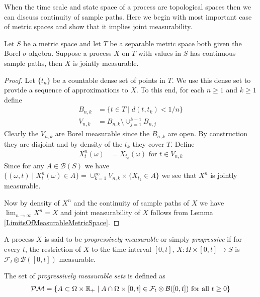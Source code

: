 When the time scale and state space of a process are topological
spaces then we can discuss continuity of sample paths.  Here we begin
with most important case of metric spaces and show that it implies
joint measurability.
\begin{lem}\label{JointMeasurabilityOfSampleContinuous}Let $S$ be a metric space and let $T$ be a separable metric
  space both given the Borel $\sigma$-algebra.  Suppose a process $X$
  on $T$ with values in $S$ has continuous sample paths, then $X$ is
  jointly measurable.
\end{lem}
\begin{proof}
Let $\lbrace t_n \rbrace$ be a countable dense set of points in $T$.
We use this dense set to provide a sequence of approximations to $X$.
To this end, for each $n\geq 1$ and $k \geq 1$ define
\begin{align*}
B_{n,k} &= \lbrace t \in T \mid d(t, t_k) < 1/n \rbrace \\
V_{n,k} &= B_{n,k} \setminus \cup_{j=1}^{k-1} B_{n,j}
\end{align*}
Clearly the $V_{n,k}$ are Borel measurable since the $B_{n,k}$ are open.
By construction they are disjoint and by density of the $t_k$ they
cover $T$.  Define
\begin{align*}
X^n_t (\omega) &= X_{t_k}(\omega) \text{ for $t \in V_{n,k}$}
\end{align*}
Since for any $A \in \mathcal{B}(S)$ we have $\lbrace (\omega, t) \mid
X^n_{t}(\omega) \in A \rbrace = \cup_{k=1}^\infty V_{n,k} \times \lbrace
X_{t_k} \in A \rbrace$ we see that $X^n$ is jointly measurable.

Now by density of $X^n$ and the continuity of sample paths of $X$ we
have $\lim_{n \to \infty} X^n = X$ and joint measurability of $X$
follows from Lemma \ref{LimitsOfMeasurableMetricSpace}.
\end{proof}

\begin{defn}A process $X$ is said to be \emph{progressively
    measurable} or simply \emph{progressive} if for every $t$, the restriction of $X$ to the time
  interval $[0,t]$, $X : \Omega \times [0,t] \to S$ is
  $\mathcal{F}_t \otimes \mathcal{B}([0,t])$ measurable.
\end{defn}

\begin{defn}The set of \emph{progressively measurable sets} is
  defined as
\begin{align*}
\mathcal{P}\mathcal{M} = \lbrace A \subset \Omega
  \times \mathbb{R}_+ \mid A \cap \Omega \times [0,t] \in \mathcal{F}_t
  \otimes \mathcal{B}([0,t]) \text{ for all } t \geq 0\rbrace
\end{align*}
\end{defn}

